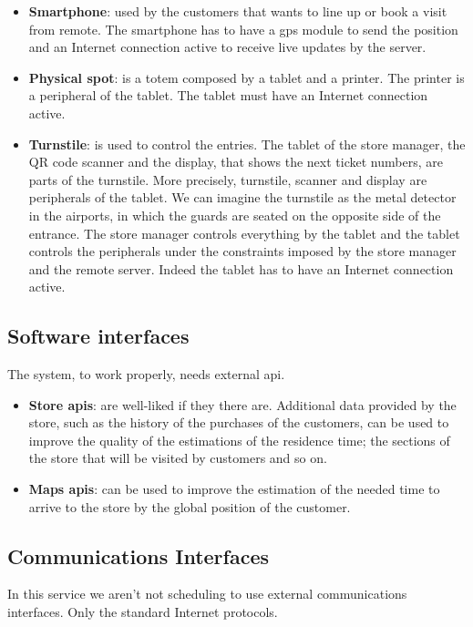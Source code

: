 \begin{itemize}
	\item \textbf{Smartphone}: used by the customers that wants to line up or book a visit from remote. The smartphone has to have a \gls{gps} module to send the position and an Internet connection active to receive live updates by the server.
	\item \textbf{Physical spot}: is a totem composed by a tablet and a printer. The printer is a peripheral of the tablet. The tablet must have an Internet connection active.
	\item \textbf{Turnstile}: is used to control the entries. The tablet of the store manager, the QR code scanner and the display, that shows the next ticket numbers, are parts of the turnstile. More precisely, turnstile, scanner and display are peripherals of the tablet.
	We can imagine the turnstile as the metal detector in the airports, in which the guards are seated on the opposite side of the entrance.
	The store manager controls everything by the tablet and the tablet controls the peripherals under the constraints imposed by the store manager and the remote server.
	Indeed the tablet has to have an Internet connection active.
\end{itemize}

\subsection{Software interfaces}

The system, to work properly, needs external \gls{api}.

\begin{itemize}
	\item \textbf{Store \glspl{api}}: are well-liked if they there are. Additional data provided by the store, such as the history of the purchases of the customers, can be used to improve the quality of the estimations of the residence time; the sections of the store that will be visited by customers and so on.
	\item \textbf{Maps \glspl{api}}: can be used to improve the estimation of the needed time to arrive to the store by the global position of the customer.
\end{itemize}

\subsection{Communications Interfaces}

In this service we aren't not scheduling to use external communications interfaces.
Only the standard Internet protocols.

